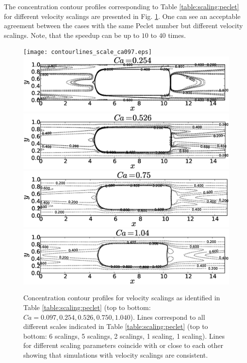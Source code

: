 \documentclass[review,12pt]{elsarticle}
\begin{document}
The concentration contour profiles corresponding to Table \ref{table:scaling:peclet} for different
velocity scalings are presented in Fig. \ref{fig:contours:scaling:peclet}. One can see an
acceptable agreement between the cases with the same Peclet number but different velocity scalings. Note, that the speedup can be up to $10$ to $40$ times.
\begin{figure}[htb!]
\texttt{[image: contourlines\_scale\_ca097.eps]}\\
\includegraphics[height=0.25\textwidth]{contourlines_scale_ca054.eps}\\
\includegraphics[height=0.25\textwidth]{contourlines_scale_ca026.eps}\\
\includegraphics[height=0.25\textwidth]{contourlines_scale_ca05.eps}\\
\includegraphics[height=0.25\textwidth]{contourlines_scale_ca14.eps}\\
\caption{Concentration contour profiles for velocity scalings as identified in Table
\ref{table:scaling:peclet} (top to bottom:
$Ca=0.097,0.254,0.526,0.750,1.040$). Lines correspond to
all different scales indicated in Table
\ref{table:scaling:peclet} (top to bottom: 6 scalings, 5 scalings, 2 scalings, 1 scaling, 1 scaling). {\color{red} Lines for different scaling parameters coincide with or close to} each other showing that simulations with velocity scalings are consistent.  \label{fig:contours:scaling:peclet}}
\end{figure}
\end{document}
